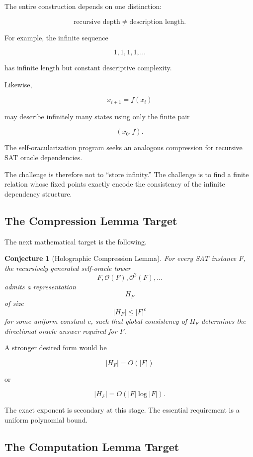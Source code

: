 \documentclass[11pt]{article}
\theoremstyle{plain}
\newtheorem{conjecture}[theorem]{Conjecture}
\theoremstyle{definition}
\begin{document}
The entire construction depends on one distinction:

\[
    \boxed{
    \text{recursive depth}
    \neq
    \text{description length}.
    }
\]

For example, the infinite sequence

\[
    1,1,1,1,\dots
\]

has infinite length but constant descriptive complexity.

Likewise,

\[
    x_{i+1}=f(x_i)
\]

may describe infinitely many states using only the finite pair

\[
    (x_0,f).
\]

The self-oracularization program seeks an analogous compression for recursive
SAT oracle dependencies.

The challenge is therefore not to ``store infinity.''  The challenge is to
find a finite relation whose fixed points exactly encode the consistency of
the infinite dependency structure.

\subsection{The Compression Lemma Target}

The next mathematical target is the following.

\begin{conjecture}[Holographic Compression Lemma]
\label{conj:holographic-compression}
For every SAT instance \(F\), the recursively generated self-oracle tower
\[
    F,\mathcal{O}(F),\mathcal{O}^2(F),\dots
\]
admits a representation
\[
    H_F
\]
of size
\[
    |H_F|\leq |F|^{c}
\]
for some uniform constant \(c\), such that global consistency of \(H_F\)
determines the directional oracle answer required for \(F\).
\end{conjecture}

A stronger desired form would be

\[
    |H_F|=O(|F|)
\]

or

\[
    |H_F|=O(|F|\log |F|).
\]

The exact exponent is secondary at this stage.  The essential requirement is
a uniform polynomial bound.

\subsection{The Computation Lemma Target}
\end{document}
